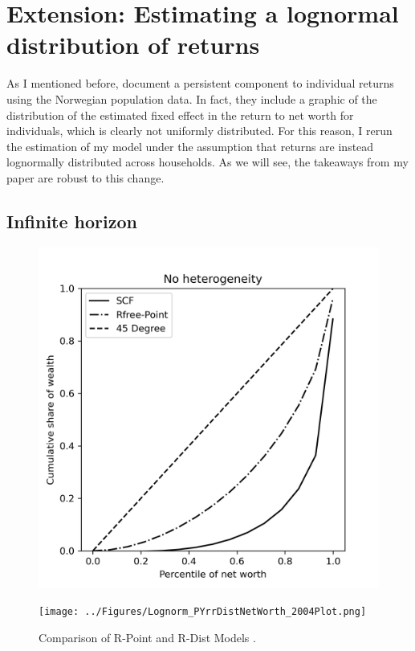 \onlyinsubfile{\setcounter{section}{5}}
\section{Extension: Estimating a lognormal distribution of returns}
\notinsubfile{\label{sec:lognorm}}

\par As I mentioned before, \cite{aflgdmlp20} document a persistent component to individual returns using the Norwegian population data. In fact, they include a graphic of the distribution of the estimated fixed effect in the return to net worth for individuals, which is clearly not uniformly distributed. For this reason, I rerun the estimation of my model under the assumption that returns are instead lognormally distributed across households. As we will see, the takeaways from my paper are robust to this change.

\subsection{Infinite horizon}

\par 

\begin{figure}[h]
    \centering
    \begin{minipage}{0.48\textwidth}
        \centering
        \includegraphics[width=\textwidth]{../Figures/Lognorm_PYrrPointNetWorth_2004Plot.png}
    \end{minipage}
    \hfill
    \begin{minipage}{0.48\textwidth}
        \centering
        \texttt{[image: ../Figures/Lognorm\_PYrrDistNetWorth\_2004Plot.png]}
    \end{minipage}
    \caption{Comparison of R-Point and R-Dist Models .}
    \label{fig:PYLognorm} 
\end{figure}


